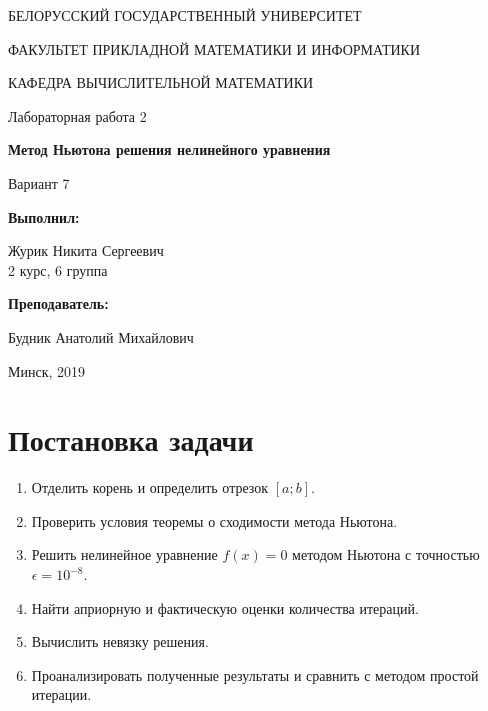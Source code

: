 \documentclass[14pt, a4paper]{article}
\begin{document}
\begin{titlepage}
\begin{center}
\large{БЕЛОРУССКИЙ ГОСУДАРСТВЕННЫЙ УНИВЕРСИТЕТ 

ФАКУЛЬТЕТ ПРИКЛАДНОЙ МАТЕМАТИКИ И ИНФОРМАТИКИ

КАФЕДРА ВЫЧИСЛИТЕЛЬНОЙ МАТЕМАТИКИ}
\end{center}
\vspace*{\fill}
\begin{center}
Лабораторная работа 2

\large{\textbf{Метод Ньютона решения нелинейного уравнения}}

Вариант 7
\end{center}
\begin{flushright}
\textbf{Выполнил:}

Журик Никита Сергеевич \\ 2 курс, 6 группа

\textbf{Преподаватель:}

Будник Анатолий Михайлович
\end{flushright}
\vspace*{\fill}
\begin{center}
Минск, 2019
\end{center}
\end{titlepage}

\tableofcontents
\newpage

\newpage
{}

  \section{Постановка задачи}
    \begin{enumerate}
      \item
      Отделить корень и определить отрезок $[a; b]$.
      \item
      Проверить условия теоремы о сходимости метода Ньютона.
      \item
      Решить нелинейное уравнение $f(x) = 0$ методом Ньютона с точностью $\epsilon = 10^{-8}$.
      \item
      Найти априорную и фактическую оценки количества итераций.
      \item
      Вычислить невязку решения.
      \item
      Проанализировать полученные результаты и сравнить с методом простой итерации.
    \end{enumerate}
\end{document}
